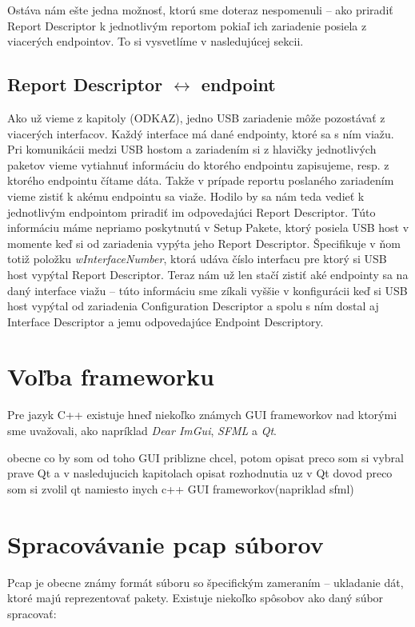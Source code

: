 Ostáva nám ešte jedna možnosť, ktorú sme doteraz nespomenuli -- ako priradiť Report Descriptor k jednotlivým reportom pokiaľ ich zariadenie posiela z viacerých endpointov. To si vysvetlíme v nasledujúcej sekcii.

\subsection{Report Descriptor $\longleftrightarrow$ endpoint}
Ako už vieme z kapitoly (ODKAZ), jedno USB zariadenie môže pozostávať z viacerých interfacov. Každý interface má dané endpointy, ktoré sa s ním viažu. Pri komunikácii medzi USB hostom a zariadením si z hlavičky jednotlivých paketov vieme vytiahnuť informáciu do ktorého endpointu zapisujeme, resp. z ktorého endpointu čítame dáta. Takže v prípade reportu poslaného zariadením vieme zistiť k akému endpointu sa viaže. Hodilo by sa nám teda vedieť k jednotlivým endpointom priradiť im odpovedajúci Report Descriptor. Túto informáciu máme nepriamo poskytnutú v Setup Pakete, ktorý posiela USB host v momente keď si od zariadenia vypýta jeho Report Descriptor. Špecifikuje v ňom totiž položku \textit{wInterfaceNumber}, ktorá udáva číslo interfacu pre ktorý si USB host vypýtal Report Descriptor. Teraz nám už len stačí zistiť aké endpointy sa na daný interface viažu -- túto informáciu sme zíkali vyššie v konfigurácii keď si USB host vypýtal od zariadenia Configuration Descriptor a spolu s ním dostal aj Interface Descriptor a jemu odpovedajúce Endpoint Descriptory.



\section{Voľba frameworku}
Pre jazyk C++ existuje hneď niekoľko známych GUI frameworkov nad ktorými sme uvažovali, ako napríklad \textit{Dear ImGui}, \textit{SFML} a \textit{Qt}. 


obecne co by som od toho GUI priblizne chcel, potom opisat preco som si vybral prave Qt a v nasledujucich kapitolach opisat rozhodnutia uz v Qt
dovod preco som si zvolil qt namiesto inych c++ GUI frameworkov(napriklad sfml)


\section{Spracovávanie pcap súborov}
Pcap je obecne známy formát súboru so špecifickým zameraním -- ukladanie dát, ktoré majú reprezentovať pakety. Existuje niekoľko spôsobov ako daný súbor spracovať:

